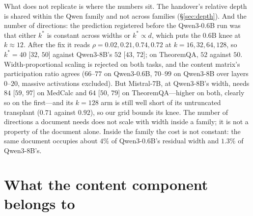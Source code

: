 \documentclass{article}
\begin{document}
What does not replicate is where the numbers sit. The handover's relative depth
is shared within the Qwen family and not across families (\S\ref{sec:depth}).
And the number of directions: the prediction registered before the Qwen3-0.6B
run was that either $k^{*}$ is constant across widths or $k^{*}\propto d$, which
puts the $0.6$B knee at $k\approx12$. After the fix it reads $\rho = 0.02, 0.21,
0.74, 0.72$ at $k = 16, 32, 64, 128$, so $k^{*}=40$ [$32$, $50$] against
Qwen3-8B's $52$ [$43$, $72$]; on TheoremQA, $52$ against $50$. Width-proportional
scaling is rejected on both tasks, and the content matrix's participation ratio
agrees ($66$--$77$ on Qwen3-0.6B, $70$--$99$ on Qwen3-8B over layers $0$--$20$,
massive activations excluded).
But Mistral-7B, at Qwen3-8B's width, needs $84$ [$59$, $97$] on MedCalc and $64$
[$50$, $79$] on TheoremQA---higher on both, clearly so on the first---and its
$k=128$ arm is still well short of its untruncated transplant ($0.71$ against
$0.92$), so our grid bounds its knee. The number of directions a document needs
does not scale with width inside a family; it is not a property of the document
alone. Inside the family the cost is not constant: the same document occupies
about $4\%$ of Qwen3-0.6B's residual width and $1.3\%$ of Qwen3-8B's.



\section{What the content component belongs to}
\label{sec:whose}
\end{document}
